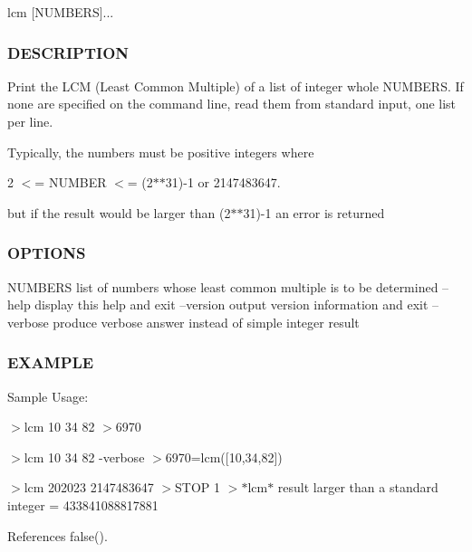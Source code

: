 \begin{DoxyVerb}    lcm [NUMBERS]...
\end{DoxyVerb}


\subsubsection*{D\+E\+S\+C\+R\+I\+P\+T\+I\+ON}

Print the L\+CM (Least Common Multiple) of a list of integer whole N\+U\+M\+B\+E\+RS. If none are specified on the command line, read them from standard input, one list per line.

Typically, the numbers must be positive integers where

2 $<$= N\+U\+M\+B\+ER $<$= (2$\ast$$\ast$31)-\/1 or 2147483647.

but if the result would be larger than (2$\ast$$\ast$31)-\/1 an error is returned

\subsubsection*{O\+P\+T\+I\+O\+NS}

N\+U\+M\+B\+E\+RS list of numbers whose least common multiple is to be determined --help display this help and exit --version output version information and exit --verbose produce verbose answer instead of simple integer result \subsubsection*{E\+X\+A\+M\+P\+LE}

Sample Usage\+:

$>$lcm 10 34 82 $>$6970

$>$lcm 10 34 82 -\/verbose $>$6970=lcm(\mbox{[}10,34,82\mbox{]})

$>$lcm 202023 2147483647 $>$S\+T\+OP 1 $>$$\ast$lcm$\ast$ result larger than a standard integer = 433841088817881 

References false().

